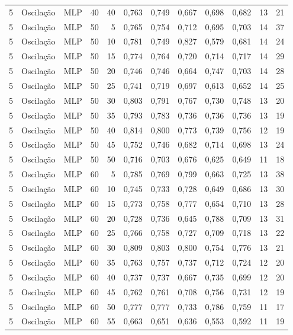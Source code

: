\begin{longtable}{@{}rllrrrrrrrrr@{}}
5 & Oscilação & MLP & 40 & 40 & 0,763 & 0,749 & 0,667 & 0,698 & 0,682 & 13 & 21 \\
5 & Oscilação & MLP & 50 & 5 & 0,765 & 0,754 & 0,712 & 0,695 & 0,703 & 14 & 37 \\
5 & Oscilação & MLP & 50 & 10 & 0,781 & 0,749 & 0,827 & 0,579 & 0,681 & 14 & 24 \\
5 & Oscilação & MLP & 50 & 15 & 0,774 & 0,764 & 0,720 & 0,714 & 0,717 & 14 & 29 \\
5 & Oscilação & MLP & 50 & 20 & 0,746 & 0,746 & 0,664 & 0,747 & 0,703 & 14 & 28 \\
5 & Oscilação & MLP & 50 & 25 & 0,741 & 0,719 & 0,697 & 0,613 & 0,652 & 14 & 25 \\
5 & Oscilação & MLP & 50 & 30 & 0,803 & 0,791 & 0,767 & 0,730 & 0,748 & 13 & 20 \\
5 & Oscilação & MLP & 50 & 35 & 0,793 & 0,783 & 0,736 & 0,736 & 0,736 & 13 & 19 \\
5 & Oscilação & MLP & 50 & 40 & 0,814 & 0,800 & 0,773 & 0,739 & 0,756 & 12 & 19 \\
5 & Oscilação & MLP & 50 & 45 & 0,752 & 0,746 & 0,682 & 0,714 & 0,698 & 13 & 24 \\
5 & Oscilação & MLP & 50 & 50 & 0,716 & 0,703 & 0,676 & 0,625 & 0,649 & 11 & 18 \\
5 & Oscilação & MLP & 60 & 5 & 0,785 & 0,769 & 0,799 & 0,663 & 0,725 & 13 & 38 \\
5 & Oscilação & MLP & 60 & 10 & 0,745 & 0,733 & 0,728 & 0,649 & 0,686 & 13 & 30 \\
5 & Oscilação & MLP & 60 & 15 & 0,773 & 0,758 & 0,777 & 0,654 & 0,710 & 13 & 28 \\
5 & Oscilação & MLP & 60 & 20 & 0,728 & 0,736 & 0,645 & 0,788 & 0,709 & 13 & 31 \\
5 & Oscilação & MLP & 60 & 25 & 0,766 & 0,758 & 0,727 & 0,709 & 0,718 & 13 & 22 \\
5 & Oscilação & MLP & 60 & 30 & 0,809 & 0,803 & 0,800 & 0,754 & 0,776 & 13 & 21 \\
5 & Oscilação & MLP & 60 & 35 & 0,763 & 0,757 & 0,737 & 0,712 & 0,724 & 12 & 20 \\
5 & Oscilação & MLP & 60 & 40 & 0,737 & 0,737 & 0,667 & 0,735 & 0,699 & 12 & 20 \\
5 & Oscilação & MLP & 60 & 45 & 0,762 & 0,761 & 0,708 & 0,756 & 0,731 & 12 & 19 \\
5 & Oscilação & MLP & 60 & 50 & 0,777 & 0,777 & 0,733 & 0,786 & 0,759 & 11 & 17 \\
5 & Oscilação & MLP & 60 & 55 & 0,663 & 0,651 & 0,636 & 0,553 & 0,592 & 11 & 19 \\

\end{longtable}
